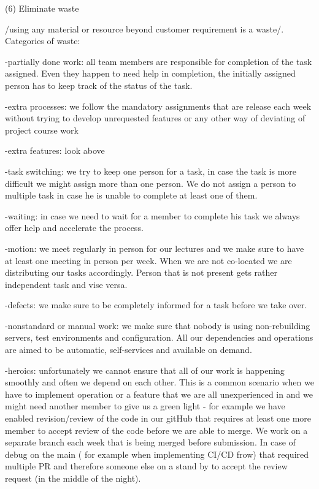 \documentclass{article}
\begin{document}
(6) Eliminate waste 

/using any material or resource beyond customer requirement is a waste/. Categories of waste: 

-partially done work: all team members are responsible for completion of the task assigned. Even they happen to need help in completion, the initially assigned person has to keep track of the status of the task.

-extra processes: we follow the mandatory assignments that are release each week without trying to develop unrequested features or any other way of deviating of project course work

-extra features: look above

-task switching: we try to keep one person for a task, in case the task is more difficult we might assign more than one person. We do not assign a person to multiple task in case he is unable to complete at least one of them.

-waiting: in case we need to wait for a member to complete his task we always offer help and accelerate the process.

-motion: we meet regularly in person for our lectures and we make sure to have at least one meeting in person per week. When we are not co-located we are distributing our tasks accordingly. Person that is not present gets rather independent task and vise versa. 

-defects: we make sure to be completely informed for a task before we take over.

-nonstandard or manual work: we make sure that nobody is using non-rebuilding servers, test environments and configuration. All our dependencies and operations are aimed to be automatic, self-services and available on demand.

-heroics: unfortunately we cannot ensure that all of our work is happening smoothly and often we depend on each other. This is a common scenario when we have to implement operation or a feature that we are all unexperienced in and we might need another member to give us a green light - for example we have enabled revision/review of the code in our gitHub that requires at least one more member to accept review of the code before we are able to merge. We work on a separate branch each week that is being merged before submission. In case of debug on the main ( for example when implementing CI/CD frow) that required multiple PR and therefore someone else on a stand by to accept the review request (in the middle of the night).
\end{document}

